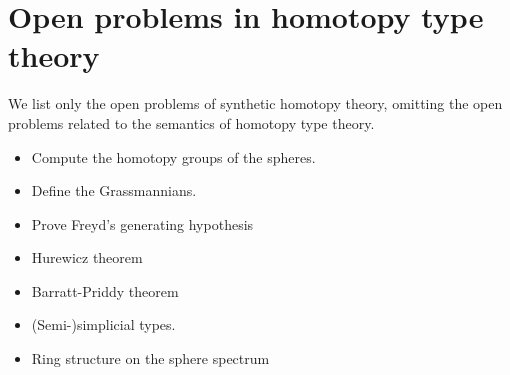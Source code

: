 \documentclass[11pt]{memoir} %
\begin{document}
\chapter{Open problems in homotopy type theory}
We list only the open problems of synthetic homotopy theory, omitting the open problems related to the semantics of homotopy type theory.
\begin{itemize}
\item Compute the homotopy groups of the spheres.
\item Define the Grassmannians.
\item Prove Freyd's generating hypothesis
\item Hurewicz theorem
\item Barratt-Priddy theorem
\item (Semi-)simplicial types.
\item Ring structure on the sphere spectrum
\end{itemize}

\end{document}
